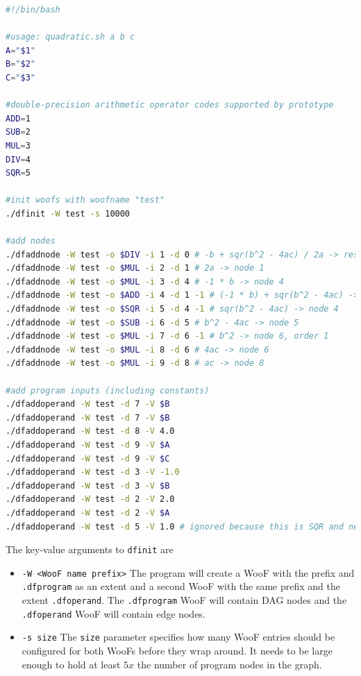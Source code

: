 \documentclass[10pt]{article}
\begin{document}
\begin{lstlisting}[language=bash,caption={quadratic.sh},label={lst:quad}]
#!/bin/bash

#usage: quadratic.sh a b c
A="$1"
B="$2"
C="$3"

#double-precision arithmetic operator codes supported by prototype
ADD=1
SUB=2
MUL=3
DIV=4
SQR=5

#init woofs with woofname "test"
./dfinit -W test -s 10000

#add nodes
./dfaddnode -W test -o $DIV -i 1 -d 0 # -b + sqr(b^2 - 4ac) / 2a -> result
./dfaddnode -W test -o $MUL -i 2 -d 1 # 2a -> node 1
./dfaddnode -W test -o $MUL -i 3 -d 4 # -1 * b -> node 4
./dfaddnode -W test -o $ADD -i 4 -d 1 -1 # (-1 * b) + sqr(b^2 - 4ac) -> node 1, order 1
./dfaddnode -W test -o $SQR -i 5 -d 4 -1 # sqr(b^2 - 4ac) -> node 4
./dfaddnode -W test -o $SUB -i 6 -d 5 # b^2 - 4ac -> node 5
./dfaddnode -W test -o $MUL -i 7 -d 6 -1 # b^2 -> node 6, order 1
./dfaddnode -W test -o $MUL -i 8 -d 6 # 4ac -> node 6
./dfaddnode -W test -o $MUL -i 9 -d 8 # ac -> node 8

#add program inputs (including constants)
./dfaddoperand -W test -d 7 -V $B
./dfaddoperand -W test -d 7 -V $B
./dfaddoperand -W test -d 8 -V 4.0
./dfaddoperand -W test -d 9 -V $A
./dfaddoperand -W test -d 9 -V $C
./dfaddoperand -W test -d 3 -V -1.0
./dfaddoperand -W test -d 3 -V $B
./dfaddoperand -W test -d 2 -V 2.0
./dfaddoperand -W test -d 2 -V $A
./dfaddoperand -W test -d 5 -V 1.0 # ignored because this is SQR and need two op

\end{lstlisting}
The key-value arguments to \verb+dfinit+ are
\begin{itemize}
\item \verb+-W <WooF name prefix>+ The program will create a WooF with the
prefix and \verb+.dfprogram+ as an extent and a second WooF with the same
prefix and the extent \verb+.dfoperand+.  The \verb+.dfprogram+ WooF will
contain DAG nodes and the \verb+.dfoperand+ WooF will contain edge nodes.
\item \verb+-s size+ The \verb+size+ parameter specifies how many WooF entries
should be configured for both WooFs before they wrap around.  It needs to be
large enough to hold at least $5x$ the number of program nodes in the graph.
\end{itemize}
\end{document}
